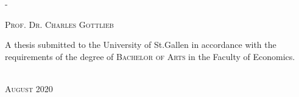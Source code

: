 \begin{titlingpage}
\begin{SingleSpace}
\begin{adjustwidth*}{\unitlength}{-\unitlength}
\begin{center}
{\textsc{Prof. Dr. Charles Gottlieb}}\\
\vspace{9mm}
\begin{minipage}{10cm}
A thesis submitted to the University of St.Gallen in accordance with the requirements of the degree of \textsc{Bachelor of Arts} in the Faculty of Economics.
\end{minipage}\\
\vspace{13mm}
{\large\textsc{August 2020}}
\vspace{12mm}
\end{center}
\end{adjustwidth*}
\end{SingleSpace}
\end{titlingpage}